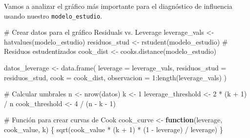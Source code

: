 \documentclass[
  letterpaper,
  DIV=11,
  numbers=noendperiod]{scrreprt}
\newenvironment{Shaded}{\begin{snugshade}}{\end{snugshade}}
\newcommand{\AttributeTok}[1]{\textcolor[rgb]{0.40,0.45,0.13}{#1}}
\newcommand{\CommentTok}[1]{\textcolor[rgb]{0.37,0.37,0.37}{#1}}
\newcommand{\ControlFlowTok}[1]{\textcolor[rgb]{0.00,0.23,0.31}{\textbf{#1}}}
\newcommand{\DecValTok}[1]{\textcolor[rgb]{0.68,0.00,0.00}{#1}}
\newcommand{\FunctionTok}[1]{\textcolor[rgb]{0.28,0.35,0.67}{#1}}
\newcommand{\NormalTok}[1]{\textcolor[rgb]{0.00,0.23,0.31}{#1}}
\newcommand{\OtherTok}[1]{\textcolor[rgb]{0.00,0.23,0.31}{#1}}
\newcommand{\SpecialCharTok}[1]{\textcolor[rgb]{0.37,0.37,0.37}{#1}}
\begin{document}
\begin{tcolorbox}[enhanced jigsaw, breakable, toprule=.15mm, bottomtitle=1mm, coltitle=black, colbacktitle=quarto-callout-tip-color!10!white, titlerule=0mm, opacitybacktitle=0.6, bottomrule=.15mm, toptitle=1mm, title=\textcolor{quarto-callout-tip-color}{\faLightbulb}\hspace{0.5em}{Ejemplo: Gráfico Residuals vs.~Leverage}, arc=.35mm, rightrule=.15mm, opacityback=0, colframe=quarto-callout-tip-color-frame, leftrule=.75mm, left=2mm, colback=white]

Vamos a analizar el gráfico más importante para el diagnóstico de
influencia usando nuestro \texttt{modelo\_estudio}.

\begin{Shaded}
\begin{Highlighting}[]
\CommentTok{\# Crear datos para el gráfico Residuals vs. Leverage}
\NormalTok{leverage\_vals }\OtherTok{\textless{}{-}} \FunctionTok{hatvalues}\NormalTok{(modelo\_estudio)}
\NormalTok{residuos\_stud }\OtherTok{\textless{}{-}} \FunctionTok{rstudent}\NormalTok{(modelo\_estudio)  }\CommentTok{\# Residuos estudentizados}
\NormalTok{cook\_dist }\OtherTok{\textless{}{-}} \FunctionTok{cooks.distance}\NormalTok{(modelo\_estudio)}

\NormalTok{datos\_leverage }\OtherTok{\textless{}{-}} \FunctionTok{data.frame}\NormalTok{(}
  \AttributeTok{leverage =}\NormalTok{ leverage\_vals,}
  \AttributeTok{residuos\_stud =}\NormalTok{ residuos\_stud,}
  \AttributeTok{cook =}\NormalTok{ cook\_dist,}
  \AttributeTok{observacion =} \DecValTok{1}\SpecialCharTok{:}\FunctionTok{length}\NormalTok{(leverage\_vals)}
\NormalTok{)}

\CommentTok{\# Calcular umbrales}
\NormalTok{n }\OtherTok{\textless{}{-}} \FunctionTok{nrow}\NormalTok{(datos)}
\NormalTok{k }\OtherTok{\textless{}{-}} \DecValTok{1}
\NormalTok{leverage\_threshold }\OtherTok{\textless{}{-}} \DecValTok{2} \SpecialCharTok{*}\NormalTok{ (k }\SpecialCharTok{+} \DecValTok{1}\NormalTok{) }\SpecialCharTok{/}\NormalTok{ n}
\NormalTok{cook\_threshold }\OtherTok{\textless{}{-}} \DecValTok{4} \SpecialCharTok{/}\NormalTok{ (n }\SpecialCharTok{{-}}\NormalTok{ k }\SpecialCharTok{{-}} \DecValTok{1}\NormalTok{)}

\CommentTok{\# Función para crear curvas de Cook}
\NormalTok{cook\_curve }\OtherTok{\textless{}{-}} \ControlFlowTok{function}\NormalTok{(leverage, cook\_value, k) \{}
  \FunctionTok{sqrt}\NormalTok{(cook\_value }\SpecialCharTok{*}\NormalTok{ (k }\SpecialCharTok{+} \DecValTok{1}\NormalTok{) }\SpecialCharTok{*}\NormalTok{ (}\DecValTok{1} \SpecialCharTok{{-}}\NormalTok{ leverage) }\SpecialCharTok{/}\NormalTok{ leverage)}
\NormalTok{\}}


\end{Highlighting}
\end{Shaded}
\end{tcolorbox}
\end{document}
